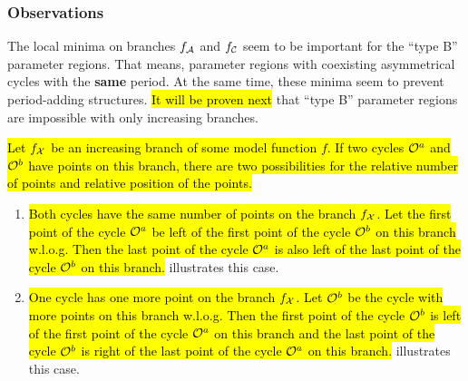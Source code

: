 \subsubsection{Observations}

The local minima on branches $f_{\mathcal{A}}$ and $f_{\mathcal{C}}$ seem to be important for the ``type B'' parameter regions.
That means, parameter regions with coexisting asymmetrical cycles with the \textbf{same} period.
At the same time, these minima seem to prevent period-adding structures.
\hl{It will be proven next} that ``type B'' parameter regions are impossible with only increasing branches.

\begin{lemma}
	\hl{
		Let $f_{\mathcal{X}}$ be an increasing branch of some model function $f$.
		If two cycles $\mathcal{O}^a$ and $\mathcal{O}^b$ have points on this branch, there are two possibilities for the relative number of points and relative position of the points.
	}
	\begin{enumerate}
		\item
		      \hl{
			      Both cycles have the same number of points on the branch $f_{\mathcal{X}}$.
			      Let the first point of the cycle $\mathcal{O}^a$ be left of the first point of the cycle $\mathcal{O}^b$ on this branch w.l.o.g.
			      Then the last point of the cycle $\mathcal{O}^a$ is also left of the last point of the cycle $\mathcal{O}^b$ on this branch.
		      }
		       illustrates this case.
		\item
		      \hl{
			      One cycle has one more point on the branch $f_{\mathcal{X}}$.
			      Let $\mathcal{O}^b$ be the cycle with more points on this branch w.l.o.g.
			      Then the first point of the cycle $\mathcal{O}^b$ is left of the first point of the cycle $\mathcal{O}^a$ on this branch and the last point of the cycle $\mathcal{O}^b$ is right of the last point of the cycle $\mathcal{O}^a$ on this branch.
		      }
		       illustrates this case.
	\end{enumerate}
	\label{lemma:add.num.pos.points.increasing}
\end{lemma}

